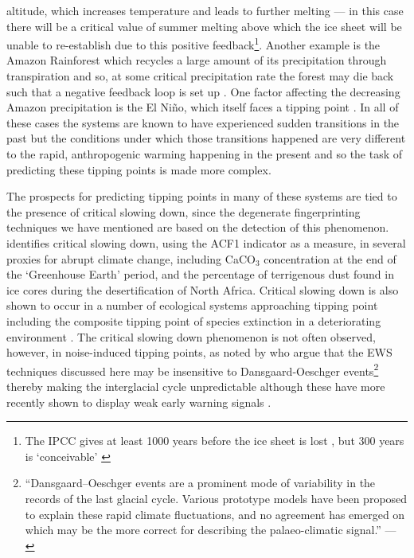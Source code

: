 {{altitude, which increases temperature and leads to further melting \citep{saltzman2001dynamical, toniazzo2004climatic} — in this case there will be a critical value of summer melting above which the ice sheet will be unable to re-establish due to this positive feedback\footnote{The IPCC gives at least 1000 years before the ice sheet is lost \citep{solomon2007climate}, but 300 years is `conceivable' \citep{hansen2005slippery, lenton2008}}. Another example is the Amazon Rainforest which recycles a large amount of its precipitation through transpiration \citep{zeng1996climatic} and so, at some critical precipitation rate the forest may die back such that a negative feedback loop is set up \citep{cox2004amazonian,nobre2009tipping}. One factor affecting the decreasing Amazon precipitation is the El Ni\~{n}o, which itself faces a tipping point \citep{philander2003nino, guilyardi2006nino}. In all of these cases the systems are known to have experienced sudden transitions in the past but the conditions under which those transitions happened are very different to the rapid, anthropogenic warming happening in the present \citep{claussen2003climate,lenton2008} and so the task of predicting these tipping points is made more complex.

The prospects for predicting tipping points in many of these systems are tied to the presence of critical slowing down, since the degenerate fingerprinting techniques we have mentioned are based on the detection of this phenomenon. \cite{dakos2008slowing} identifies critical slowing down, using the ACF1 indicator as a measure, in several proxies for abrupt climate change, including CaCO$_3$ concentration at the end of the `Greenhouse Earth' period, and the percentage of terrigenous dust found in ice cores during the desertification of North Africa. Critical slowing down is also shown to occur in a number of ecological systems approaching tipping point \citep{rinaldi2000geometric, scheffer2001, van2007, scheffer2009} including the composite tipping point of species extinction in a deteriorating environment \citep{drake2010early}. The critical slowing down phenomenon is not often observed, however, in noise-induced tipping points, as noted by \cite{ditlevsen2010} who argue that the EWS techniques discussed here may be insensitive to Dansgaard‐Oeschger events\footnote{``Dansgaard–Oeschger events are a prominent mode of variability in the records of the last glacial cycle. Various prototype models have been proposed to explain these rapid climate fluctuations, and no agreement has emerged on which may be the more correct for describing the palaeo-climatic signal.'' — \cite{cimatoribus2013dansgaard}} thereby making the interglacial cycle unpredictable \citep{crucifix2013} although these have more recently shown to display weak early warning signals \citep{cimatoribus2013dansgaard}.

}}

